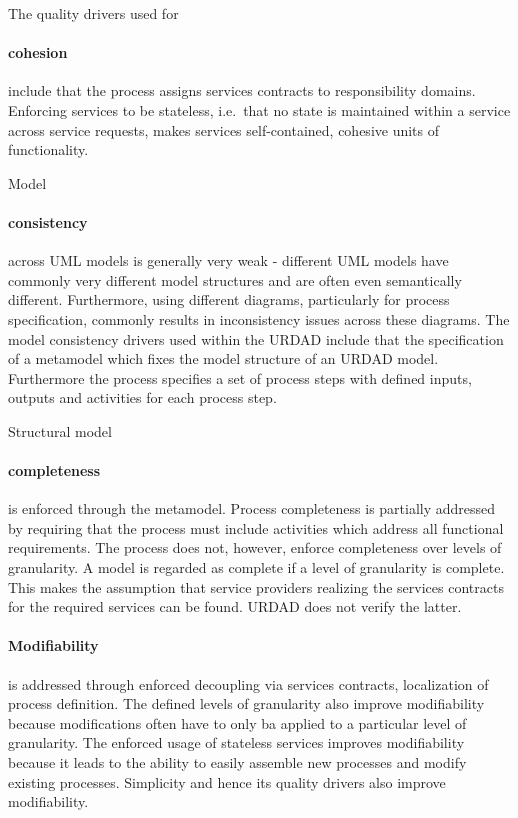 The quality drivers used for \paragraph{cohesion} include that the process assigns services contracts to responsibility domains. Enforcing services to be stateless, i.e.\ that no state is maintained within a service across service requests, makes services self-contained, cohesive units of functionality.

Model \paragraph{consistency} across UML models is generally very weak - different UML models have commonly very different model structures and are often even semantically different. Furthermore, using different diagrams, particularly for process specification, commonly results in inconsistency issues across these diagrams. The model consistency drivers used within the URDAD include that the specification of a metamodel which fixes the model structure of an URDAD model. Furthermore the process specifies a set of process steps with defined inputs, outputs and activities for each process step.

Structural model \paragraph{completeness} is enforced through the metamodel. Process completeness is partially addressed by requiring that the process must include activities which address all functional requirements. The process does not, however, enforce completeness over levels of granularity. A model is regarded as complete if a level of granularity is complete. This makes the assumption that service providers realizing the services contracts for the required services can be found. URDAD does not verify the latter.

\paragraph{Modifiability} is addressed through enforced decoupling via services contracts, localization of process definition. The defined levels of granularity also improve modifiability because modifications often have to only ba applied to a particular level of granularity. The enforced usage of stateless services improves modifiability because it leads to the ability to easily assemble new processes and modify existing processes. Simplicity and hence its quality drivers also improve modifiability.

